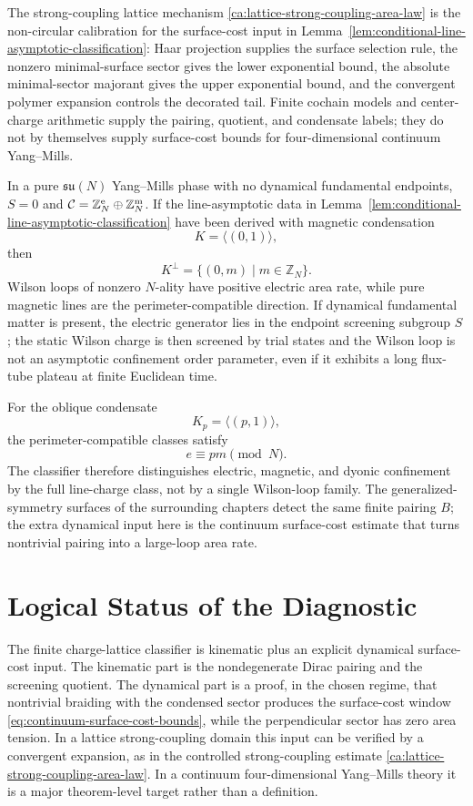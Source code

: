The strong-coupling lattice mechanism
\ref{ca:lattice-strong-coupling-area-law} is the non-circular calibration for
the surface-cost input in
Lemma~\ref{lem:conditional-line-asymptotic-classification}: Haar projection
supplies the surface selection rule, the nonzero minimal-surface sector gives
the lower exponential bound, the absolute minimal-sector majorant gives the
upper exponential bound, and the convergent polymer expansion controls the
decorated tail.  Finite cochain models and center-charge arithmetic supply the
pairing, quotient, and condensate labels; they do not by themselves supply
surface-cost bounds for four-dimensional continuum Yang--Mills.

\begin{example}
\label{ex:su-n-continuum-line-criterion}
In a pure \(\mathfrak{su}(N)\) Yang--Mills phase with no dynamical fundamental
endpoints, \(S=0\) and
\(\mathcal C=\mathbb Z_N^{\rm e}\oplus\mathbb Z_N^{\rm m}\).  If the
line-asymptotic data in
Lemma~\ref{lem:conditional-line-asymptotic-classification} have been derived
with magnetic condensation
\[
  K=\langle(0,1)\rangle ,
\]
then
\[
  K^\perp=\{(0,m)\mid m\in\mathbb Z_N\}.
\]
Wilson loops of nonzero \(N\)-ality have positive electric area rate, while
pure magnetic lines are the perimeter-compatible direction.  If dynamical
fundamental matter is present, the electric generator lies in the endpoint
screening subgroup \(S\); the static Wilson charge is then screened by trial
states and the Wilson loop is not an asymptotic confinement order parameter,
even if it exhibits a long flux-tube plateau at finite Euclidean time.

For the oblique condensate
\[
  K_p=\langle(p,1)\rangle ,
\]
the perimeter-compatible classes satisfy
\[
  e\equiv pm\pmod N .
\]
The classifier therefore distinguishes electric, magnetic, and dyonic
confinement by the full line-charge class, not by a single Wilson-loop family.
The generalized-symmetry surfaces of the surrounding chapters detect the same
finite pairing \(B\); the extra dynamical input here is the continuum
surface-cost estimate that turns nontrivial pairing into a large-loop area
rate.
\end{example}

\section{Logical Status of the Diagnostic}

The finite charge-lattice classifier is kinematic plus an explicit dynamical
surface-cost input.  The kinematic part is the nondegenerate Dirac pairing and
the screening quotient.  The dynamical part is a proof, in the chosen regime,
that nontrivial braiding with the condensed sector produces the surface-cost
window \eqref{eq:continuum-surface-cost-bounds}, while the perpendicular sector
has zero area tension.  In a lattice strong-coupling domain this input can be
verified by a convergent expansion, as in
the controlled strong-coupling estimate
\ref{ca:lattice-strong-coupling-area-law}.  In a continuum
four-dimensional Yang--Mills theory it is a major theorem-level target rather
than a definition.

